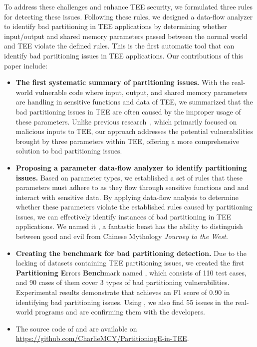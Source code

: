To address these challenges and enhance TEE security, we formulated three rules for detecting these issues. 
Following these rules, we designed a data-flow analyzer to identify bad partitioning in TEE applications by determining whether input/output and shared memory parameters passed between the normal world and TEE violate the defined rules.
This is the first automatic tool that can identify bad partitioning issues in TEE applications.
Our contributions of this paper include:
\begin{itemize}
    \item \textbf{The first systematic summary of partitioning issues.} 
    With the real-world vulnerable code where input, output, and shared memory parameters are handling in sensitive functions and data of TEE, we summarized that the bad partitioning issues in TEE are often caused by the improper usage of these parameters.
    Unlike previous research~\cite{10.1145/3373376.3378486, 9152801}, which primarily focused on malicious inputs to TEE, our approach addresses the potential vulnerabilities brought by three parameters within TEE, offering a more comprehensive solution to bad partitioning issues.
    \item \textbf{Proposing a parameter data-flow analyzer to identify partitioning issues.} 
    Based on parameter types, we established a set of rules that these parameters must adhere to as they flow through sensitive functions and and interact with sensitive data.
    By applying data-flow analysis to determine whether these parameters violate the established rules caused by partitioning issues, we can effectively identify instances of bad partitioning in TEE applications.
    We named it \textbf{\ccSysName}, a fantastic beast has the ability to distinguish between good and evil from Chinese Mythology \textit{Journey to the West}.
    \item \textbf{Creating the benchmark for bad partitioning detection.} Due to the lacking of datasets containing TEE partitioning issues, we created the first \textbf{Partitioning} \textbf{E}rrors \textbf{Bench}mark named \textbf{\ccBenchName}, which consists of 110 test cases, and 90 cases of them cover 3 types of bad partitioning vulnerabilities. Experimental results demonstrate that \ccSysName achieves an F1 score of 0.90 in identifying bad partitioning issues. Using \ccSysName, we also find 55 issues in the real-world programs and are confirming them with the developers.
    \item The source code of \ccSysName and \ccBenchName are available on \url{https://github.com/CharlieMCY/PartitioningE-in-TEE}.
\end{itemize}

